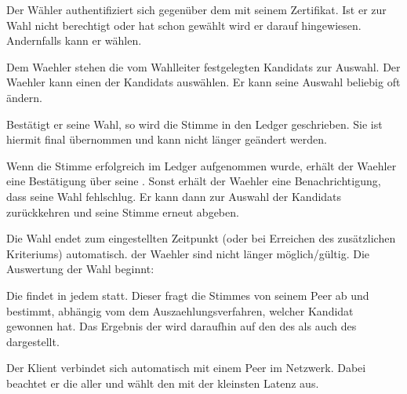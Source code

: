 \documentclass[parskip=full,11pt,twoside]{scrartcl}
\begin{document}
Der Wähler authentifiziert sich gegenüber dem  mit seinem \gls{Zertifikat}.
Ist er zur \gls{Wahl} nicht berechtigt oder hat schon gewählt wird er darauf hingewiesen.
Andernfalls kann er wählen.

Dem \gls{Waehler} stehen die vom \gls{Wahlleiter} festgelegten \glspl{Kandidat} zur Auswahl.
Der \gls{Waehler} kann einen der \glspl{Kandidat} auswählen.
Er kann seine Auswahl beliebig oft ändern.

Bestätigt er seine \gls{Wahl}, so wird die \gls{Stimme} in den \gls{Ledger} geschrieben.
Sie ist hiermit final übernommen und kann nicht länger geändert werden.

Wenn die \gls{Stimme} erfolgreich im \gls{Ledger} aufgenommen wurde, erhält der \gls{Waehler} eine Bestätigung über seine .
Sonst erhält der \gls{Waehler} eine Benachrichtigung, dass seine \gls{Wahl} fehlschlug.
Er kann dann zur Auswahl der \glspl{Kandidat} zurückkehren und seine \gls{Stimme} erneut abgeben.

Die \gls{Wahl} endet zum eingestellten Zeitpunkt (oder bei Erreichen des zusätzlichen Kriteriums) automatisch.  der \gls{Waehler} sind nicht länger möglich/gültig. Die Auswertung der \gls{Wahl} beginnt:

Die  findet in jedem  statt. Dieser fragt die \glspl{Stimme} von seinem \gls{Peer} ab und bestimmt, abhängig vom dem \gls{Auszaehlungsverfahren}, welcher \gls{Kandidat} gewonnen hat. Das Ergebnis der  wird daraufhin auf den  des  als auch des  dargestellt.

Der \gls{Klient} verbindet sich automatisch mit einem \gls{Peer} im \gls{Netzwerk}. Dabei beachtet er die  aller  und wählt den mit der kleinsten \gls{Latenz} aus.
\end{document}
